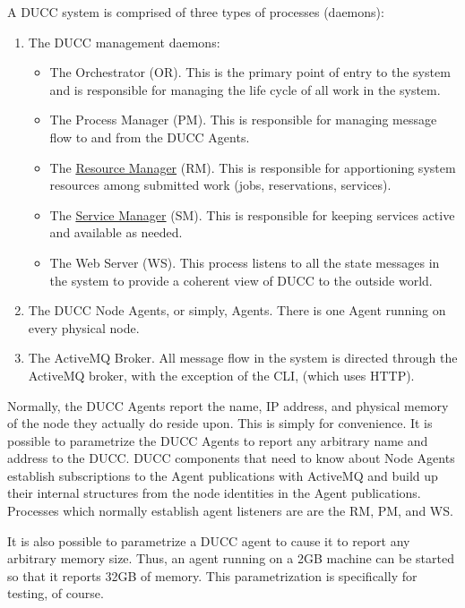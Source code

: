     A DUCC system is comprised of three types of processes (daemons):
    \begin{enumerate}
      \item The DUCC management daemons: 
        \begin{itemize}
           \item The Orchestrator (OR). This is the primary point of
             entry to the system and is responsible for managing
             the life cycle of all work in the system.
           \item The Process Manager (PM).  This is responsible for
             managing message flow to and from the DUCC Agents.
           \item The \hyperref[chap:rm]{Resource Manager} (RM). This is responsible for
             apportioning system resources among submitted work 
             (jobs, reservations, services).
           \item The \hyperref[chap:services]{Service Manager} (SM). This is responsible for
             keeping services active and available as needed.
           \item The Web Server (WS). This process listens to all
             the state messages in the system to provide a coherent
             view of DUCC to the outside world.
        \end{itemize}
        \item The DUCC Node Agents, or simply, Agents.  There is
          one Agent running on every physical node.
        \item The ActiveMQ Broker.  All message flow in the system
          is directed through the ActiveMQ broker, with the exception
          of the CLI, (which uses HTTP).
    \end{enumerate}
    
    Normally, the DUCC Agents report the name, IP address, and physical memory of the node 
    they actually do reside upon. This is simply for convenience. 
    It is possible to parametrize the DUCC Agents to report any arbitrary
    name and address to the DUCC.  DUCC components that need to know
    about Node Agents establish subscriptions to the Agent publications
    with ActiveMQ and build up their internal structures from the 
    node identities in the Agent publications.  Processes which normally 
    establish agent listeners are are the RM, PM, and WS.

    It is also possible to parametrize a DUCC agent to cause it to
    report any arbitrary memory size.  Thus, an agent running on a
    2GB machine can be started so that it reports 32GB of memory. This
    parametrization is specifically for testing, of course.

